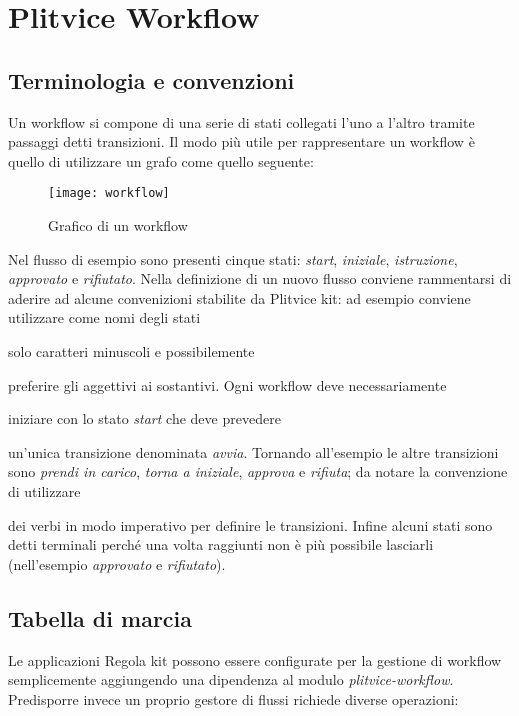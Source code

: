 \chapter{Plitvice Workflow}

\section{Terminologia e convenzioni}
Un workflow si compone di una serie di stati collegati l'uno a l'altro tramite passaggi detti transizioni. Il modo più utile per rappresentare un workflow è quello di utilizzare un grafo come quello seguente:

\begin{figure}[h!]
  \centering
    \texttt{[image: workflow]} 
  \caption[workflow]{Grafico di un workflow \label{fig:workflow}}
\end{figure}

Nel flusso di esempio sono presenti cinque stati: \textit{start}, \textit{iniziale}, \textit{istruzione}, \textit{approvato} e \textit{rifiutato}.  Nella definizione di un nuovo flusso conviene rammentarsi di aderire ad alcune convenizioni stabilite da Plitvice kit: ad esempio conviene utilizzare come nomi degli stati  
\begin{inparaenum}
\item  solo caratteri minuscoli e possibilemente \item preferire gli aggettivi ai sostantivi. 
Ogni workflow deve necessariamente \item iniziare  con lo stato \textit{start} che deve prevedere  \item un'unica transizione denominata \textit{avvia}.
Tornando all'esempio le altre transizioni sono \textit{prendi in carico}, \textit{torna a iniziale}, \textit{approva} e \textit{rifiuta}; da notare la convenzione di utilizzare \item dei verbi in modo imperativo per definire le transizioni. 
Infine alcuni stati sono detti terminali perché una volta raggiunti non è più possibile lasciarli (nell'esempio \textit{approvato} e \textit{rifiutato}).
\end{inparaenum}


\section{Tabella di marcia}
Le applicazioni Regola kit possono essere configurate per la gestione di workflow semplicemente aggiungendo una dipendenza al modulo \textit{plitvice-workflow}. Predisporre invece un proprio gestore di flussi richiede diverse operazioni:

